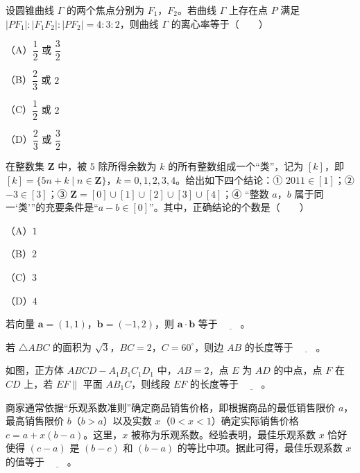 \begin{question}
设圆锥曲线 $\Gamma$ 的两个焦点分别为 $F_1$，$F_2$。若曲线 $\Gamma$ 上存在点 $P$ 满足 $|PF_1|:|F_1F_2|:|PF_2|=4:3:2$，则曲线 $\Gamma$ 的离心率等于\mbox{（　　）}

（A）$\dfrac12$ 或 $\dfrac32$

（B）$\dfrac23$ 或 $2$

（C）$\dfrac12$ 或 $2$

（D）$\dfrac23$ 或 $\dfrac32$

\end{question}
\begin{question}
在整数集 $\mathbf Z$ 中，被 $5$ 除所得余数为 $k$ 的所有整数组成一个“类”，记为 $[k]$，即 $[k]=\{5n+k\mid n\in\mathbf Z\}$，$k=0,1,2,3,4$。给出如下四个结论：① $2011\in[1]$；② $-3\in[3]$；③ $\mathbf Z=[0]\cup[1]\cup[2]\cup[3]\cup[4]$；④ “整数 $a$，$b$ 属于同一‘类’”的充要条件是“$a-b\in[0]$”。其中，正确结论的个数是\mbox{（　　）}

（A）$1$

（B）$2$

（C）$3$

（D）$4$

\end{question}

\begin{question}
若向量 $\boldsymbol a=(1,1)$，$\boldsymbol b=(-1,2)$，则 $\boldsymbol a\cdot\boldsymbol b$ 等于 $\underline{\qquad}$。

\end{question}
\begin{question}
若 $\triangle ABC$ 的面积为 $\sqrt3$，$BC=2$，$C=60^\circ$，则边 $AB$ 的长度等于 $\underline{\qquad}$。

\Needspace{0.4\textheight}
\end{question}
\begin{question}
如图，正方体 $ABCD-A_1B_1C_1D_1$ 中，$AB=2$，点 $E$ 为 $AD$ 的中点，点 $F$ 在 $CD$ 上，若 $EF\parallel$ 平面 $AB_1C$，则线段 $EF$ 的长度等于 $\underline{\qquad}$。
\nopagebreak[4]
\begin{center}\end{center}
\nopagebreak[4]
\end{question}
\begin{question}
商家通常依据“乐观系数准则”确定商品销售价格，即根据商品的最低销售限价 $a$，最高销售限价 $b$（$b>a$）以及实数 $x$（$0<x<1$）确定实际销售价格 $c=a+x(b-a)$。这里，$x$ 被称为乐观系数。经验表明，最佳乐观系数 $x$ 恰好使得 $(c-a)$ 是 $(b-c)$ 和 $(b-a)$ 的等比中项。据此可得，最佳乐观系数 $x$ 的值等于 $\underline{\qquad}$。

\end{question}

